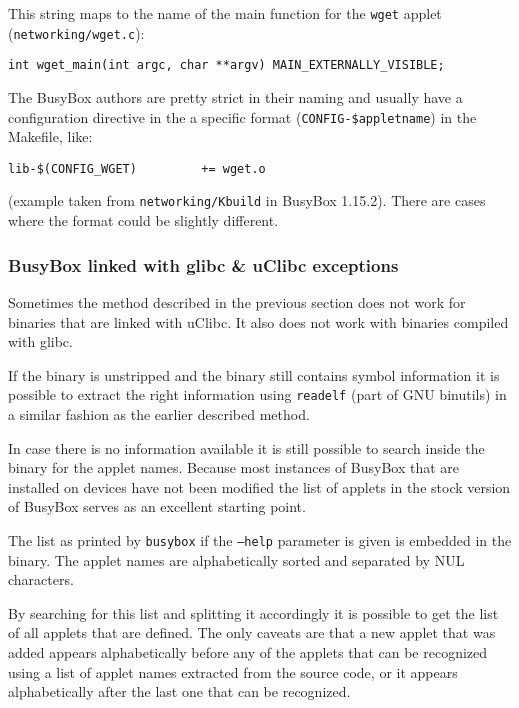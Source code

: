 \documentclass[10pt]{article}
\begin{document}
This string maps to the name of the main function for the \texttt{wget} applet
(\texttt{networking/wget.c}):

\begin{verbatim}
int wget_main(int argc, char **argv) MAIN_EXTERNALLY_VISIBLE;
\end{verbatim}

The BusyBox authors are pretty strict in their naming and usually have a
configuration directive in the a specific format
(\texttt{CONFIG-\$appletname}) in the Makefile, like:

\begin{verbatim}
lib-$(CONFIG_WGET)         += wget.o
\end{verbatim}

(example taken from \texttt{networking/Kbuild} in BusyBox 1.15.2). There are
cases where the format could be slightly different.

\subsubsection{BusyBox linked with glibc \& uClibc exceptions}

Sometimes the method described in the previous section does not work for
binaries that are linked with uClibc. It also does not work with binaries
compiled with glibc.

If the binary is unstripped and the binary still contains symbol information
it is possible to extract the right information using \texttt{readelf} (part
of GNU binutils) in a similar fashion as the earlier described method.

In case there is no information available it is still possible to search inside
the binary for the applet names. Because most instances of BusyBox that are
installed on devices have not been modified the list of applets in the stock
version of BusyBox serves as an excellent starting point.

The list as printed by \texttt{busybox} if the \texttt{--help} parameter is
given is embedded in the binary. The applet names are alphabetically sorted
and separated by NUL characters.

By searching for this list and splitting it accordingly it is possible to get
the list of all applets that are defined. The only caveats are that a new
applet that was added appears alphabetically before any of the applets that
can be recognized using a list of applet names extracted from the source code,
or it appears alphabetically after the last one that can be recognized.
\end{document}
